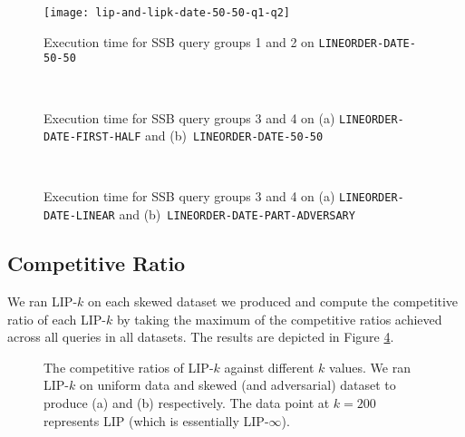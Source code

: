 \begin{figure}
    \centering
    \texttt{[image: lip-and-lipk-date-50-50-q1-q2]}
    \caption{Execution time for SSB query groups 1 and 2 on \texttt{LINEORDER-DATE-50-50}}
    \label{fig:times0}
\end{figure}

\begin{figure}
    \centering
    \\
    \caption{Execution time for SSB query groups 3 and 4 on (a) \texttt{LINEORDER-DATE-FIRST-HALF} and (b)~\texttt{LINEORDER-DATE-50-50}}
    \label{fig:times1}
\end{figure}


\begin{figure}
    \centering    
    \\
    \caption{Execution time for SSB query groups 3 and 4 on (a) \texttt{LINEORDER-DATE-LINEAR} and (b)~\texttt{LINEORDER-DATE-PART-ADVERSARY}}
    \label{fig:times2}
\end{figure}



\subsection{Competitive Ratio}
\label{sec:ratio}

We ran LIP-$k$ on each skewed dataset we produced and compute the competitive ratio of each LIP-$k$ by taking the maximum of the competitive ratios achieved across all queries in all datasets. The results are depicted in Figure \ref{fig:cr}. 

\begin{figure}
    \centering
    \quad
    \caption{The competitive ratios of LIP-$k$ against different $k$ values. We ran LIP-$k$ on uniform data and skewed (and adversarial) dataset to produce (a) and (b) respectively. The data point at $k = 200$ represents LIP (which is essentially LIP-$\infty$).}
    \label{fig:cr}
\end{figure}

